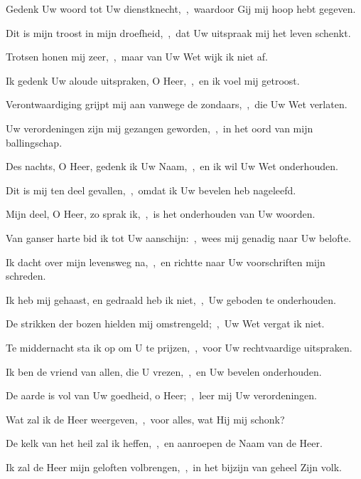 \documentclass[12pt,twoside,a5paper]{article}
\begin{document}
\begin{halfparskip}
   

  Gedenk Uw woord tot Uw dienstknecht,~\sep\ waardoor Gij mij hoop hebt gegeven.


  Dit is mijn troost in mijn droefheid,~\sep\ dat Uw uitspraak mij het leven schenkt.

  Trotsen honen mij zeer,~\sep\ maar van Uw Wet wijk ik niet af.

  Ik gedenk Uw aloude uitspraken, O Heer,~\sep\ en ik voel mij getroost.

  Verontwaardiging grijpt mij aan vanwege de zondaars,~\sep\ die Uw Wet verlaten.

  Uw verordeningen zijn mij gezangen geworden,~\sep\ in het oord van mijn ballingschap.

  Des nachts, O Heer, gedenk ik Uw Naam,~\sep\ en ik wil Uw Wet onderhouden.

  Dit is mij ten deel gevallen,~\sep\ omdat ik Uw bevelen heb nageleefd.

  Mijn deel, O Heer, zo sprak ik,~\sep\ is het onderhouden van Uw woorden.

  Van ganser harte bid ik tot Uw aanschijn:~\sep\ wees mij genadig naar Uw belofte.

  Ik dacht over mijn levensweg na,~\sep\ en richtte naar Uw voorschriften mijn schreden.

  Ik heb mij gehaast, en gedraald heb ik niet,~\sep\ Uw geboden te onderhouden.

  De strikken der bozen hielden mij omstrengeld;~\sep\ Uw Wet vergat ik niet.

  Te middernacht sta ik op om U te prijzen,~\sep\ voor Uw rechtvaardige uitspraken.

  Ik ben de vriend van allen, die U vrezen,~\sep\ en Uw bevelen onderhouden.

  De aarde is vol van Uw goedheid, o Heer;~\sep\ leer mij Uw verordeningen.
\end{halfparskip}

\begin{halfparskip}
  \noindent\begin{minipage}{\textwidth}
   
  \end{minipage}

  Wat zal ik de Heer weergeven,~\sep\ voor alles, wat Hij mij schonk?


  De kelk van het heil zal ik heffen,~\sep\ en aanroepen de Naam van de Heer.

  Ik zal de Heer mijn geloften volbrengen,~\sep\ in het bijzijn van geheel Zijn volk.
\end{halfparskip}
\end{document}
